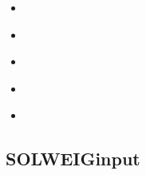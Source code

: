 \documentclass[letterpaper,10pt,english]{sphinxmanual}
\begin{document}
\begin{itemize}
\begin{itemize}
\item {} 
{\hyperref[\detokenize{input_files/SOLWEIG_input/SOLWEIGinput:cmdoption-arg-svfpath}]{}}

\item {} 
{\hyperref[\detokenize{input_files/SOLWEIG_input/SOLWEIGinput:cmdoption-arg-svfsuffix}]{}}

\item {} 
{\hyperref[\detokenize{input_files/SOLWEIG_input/SOLWEIGinput:cmdoption-arg-tdsmname}]{}}

\item {} 
{\hyperref[\detokenize{input_files/SOLWEIG_input/SOLWEIGinput:cmdoption-arg-transmax}]{}}

\item {} 
{\hyperref[\detokenize{input_files/SOLWEIG_input/SOLWEIGinput:cmdoption-arg-transmin}]{}}

\end{itemize}

\end{itemize}


\subsection{SOLWEIGinput}
\label{\detokenize{input_files/SOLWEIG_input/SOLWEIGinput:solweiginput}}\label{\detokenize{input_files/SOLWEIG_input/SOLWEIGinput::doc}}\label{\detokenize{input_files/SOLWEIG_input/SOLWEIGinput:id1}}
\end{document}
